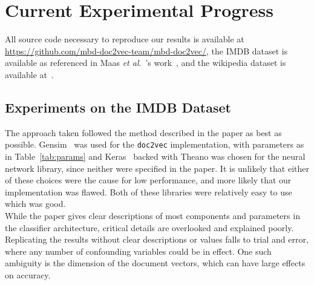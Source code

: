 \documentclass[11pt]{article}
\def\etal{\emph{et al}.\ }
\begin{document}
\section*{Current Experimental Progress}
  All source code necessary to reproduce our results is available at
  \url{https://github.com/mbd-doc2vec-team/mbd-doc2vec/}, the IMDB dataset is
  available as referenced in Maas \etal's work~\cite{maas2011}, and the wikipedia
  dataset is available at~\cite{wikidatadump2016}.
  \subsection*{Experiments on the IMDB Dataset}
    The approach taken followed the method described in the paper as best as possible.
    Gensim~\cite{gensim} was used for the \texttt{doc2vec} implementation, with parameters as
    in Table~\ref{tab:params} and Keras~\cite{keras} backed with Theano was chosen for
    the neural network library, since neither were specified in the paper. It is unlikely
    that either of these choices were the cause for low performance, and more likely
    that our implementation was flawed. Both of these libraries were relatively easy
    to use which was good.\\
    While the paper gives clear descriptions of most components and parameters in the
    classifier architecture, critical details are overlooked and explained poorly.
    Replicating the results without clear descriptions or values falls to trial and
    error, where any number of confounding variables could be in effect.
    One such ambiguity is the dimension of the document vectors, which can have
    large effects on accuracy.
\end{document}
